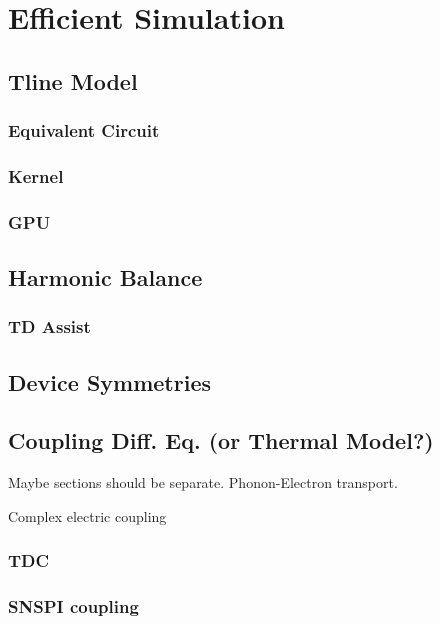\section{Efficient Simulation} \label{julia-sim-chapter}


\subsection{Tline Model}

\subsubsection{Equivalent Circuit}

\subsubsection{Kernel}

\subsubsection{GPU}

\subsection{Harmonic Balance} \label{julia-sim-hb}

\subsubsection{TD Assist}

\subsection{Device Symmetries}

\subsection{Coupling Diff. Eq. (or Thermal Model?)}

Maybe sections should be separate. Phonon-Electron transport.

Complex electric coupling

\subsubsection{TDC}

\subsubsection{SNSPI coupling}

